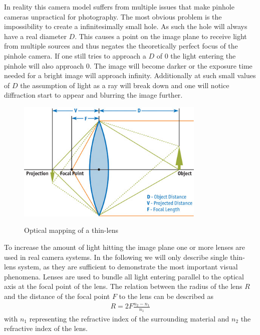 In reality this camera model suffers from multiple issues that make pinhole cameras unpractical for photography.
The most obvious problem is the impossibility to create a infinitesimally small hole.
As such the hole will always have a real diameter $D$.
This causes a point on the image plane to receive light from multiple sources and thus negates the theoretically perfect focus of the pinhole camera.
If one still tries to approach a $D$ of $0$ the light entering the pinhole will also approach $0$.
The image will become darker or the exposure time needed for a bright image will approach infinity.
Additionally at such small values of $D$ the assumption of light as a ray will break down and one will notice diffraction start to appear and blurring the image further. \cite{Beyerer.2016}

\begin{figure}[h]
    \centering
    \includegraphics[width=0.8\textwidth]{images/fig23-01_1.png}
    \caption{Optical mapping of a thin-lens}
    \label{fig:thin-lens}
    \cite{Demers.2005}
\end{figure}

To increase the amount of light hitting the image plane one or more lenses are used in real camera systems.
In the following we will only describe single thin-lens system, as they are sufficient to demonstrate the most important visual phenomena.
Lenses are used to bundle all light entering parallel to the optical axis at the focal point of the lens.
The relation between the radius of the lens $R$ and the distance of the focal point $F$ to the lens can be described as
\begin{align}
    R = 2 F \frac{n_2 - n_1}{n_1}
\end{align}
with $n_1$ representing the refractive index of the surrounding material and $n_2$ the refractive index of the lens. \cite{Beyerer.2016}

